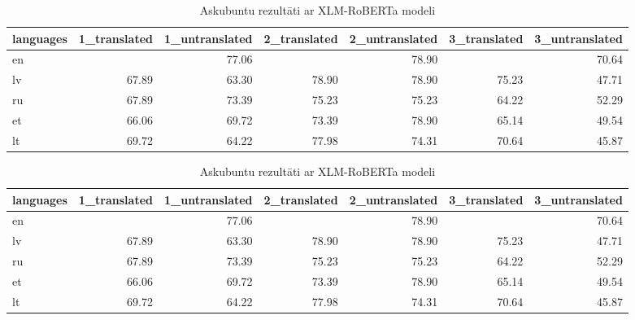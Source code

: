 \begin{table}[htbp]
  \centering
  \caption{Askubuntu rezultāti ar XLM-RoBERTa modeli}
    \begin{tabular}{lrrrrrr}\toprule
    languages & 1\_translated & 1\_untranslated & 2\_translated & 2\_untranslated & 3\_translated & 3\_untranslated \\\midrule
    en    &       & \cellcolor[rgb]{ .498,  .643,  .827}77.06 &       & \cellcolor[rgb]{ .353,  .541,  .776}78.90 &       & \cellcolor[rgb]{ .988,  .988,  1}70.64 \\
    lv    & \cellcolor[rgb]{ .984,  .922,  .933}67.89 & \cellcolor[rgb]{ .98,  .816,  .827}63.30 & \cellcolor[rgb]{ .353,  .541,  .776}78.90 & \cellcolor[rgb]{ .353,  .541,  .776}78.90 & \cellcolor[rgb]{ .639,  .741,  .878}75.23 & \cellcolor[rgb]{ .973,  .451,  .459}47.71 \\
    ru    & \cellcolor[rgb]{ .984,  .922,  .933}67.89 & \cellcolor[rgb]{ .78,  .843,  .929}73.39 & \cellcolor[rgb]{ .639,  .741,  .878}75.23 & \cellcolor[rgb]{ .639,  .741,  .878}75.23 & \cellcolor[rgb]{ .98,  .835,  .847}64.22 & \cellcolor[rgb]{ .976,  .561,  .569}52.29 \\
    et    & \cellcolor[rgb]{ .984,  .878,  .89}66.06 & \cellcolor[rgb]{ .984,  .965,  .976}69.72 & \cellcolor[rgb]{ .78,  .843,  .929}73.39 & \cellcolor[rgb]{ .353,  .541,  .776}78.90 & \cellcolor[rgb]{ .984,  .859,  .871}65.14 & \cellcolor[rgb]{ .973,  .494,  .502}49.54 \\
    lt    & \cellcolor[rgb]{ .984,  .965,  .976}69.72 & \cellcolor[rgb]{ .98,  .835,  .847}64.22 & \cellcolor[rgb]{ .427,  .592,  .804}77.98 & \cellcolor[rgb]{ .71,  .792,  .902}74.31 & \cellcolor[rgb]{ .988,  .988,  1}70.64 & \cellcolor[rgb]{ .973,  .412,  .42}45.87 \\
    \end{tabular}%
  \label{tab:askubuntu-xlm}%
\end{table}%




\begin{table}[htbp]
  \centering
  \caption{Askubuntu rezultāti ar XLM-RoBERTa modeli}
    \begin{tabular}{lrrrrrr}\toprule
    languages & 1\_translated & 1\_untranslated & 2\_translated & 2\_untranslated & 3\_translated & 3\_untranslated \\\midrule
    en    &       & 77.06 &       & 78.90 &       & 70.64 \\
    lv    & 67.89 & 63.30 & 78.90 & 78.90 & 75.23 & 47.71 \\
    ru    & 67.89 & 73.39 & 75.23 & 75.23 & 64.22 & 52.29 \\
    et    & 66.06 & 69.72 & 73.39 & 78.90 & 65.14 & 49.54 \\
    lt    & 69.72 & 64.22 & 77.98 & 74.31 & 70.64 & 45.87 \\\bottomrule
    \end{tabular}%
  \label{tab:askubuntu-xlm}%
\end{table}%




